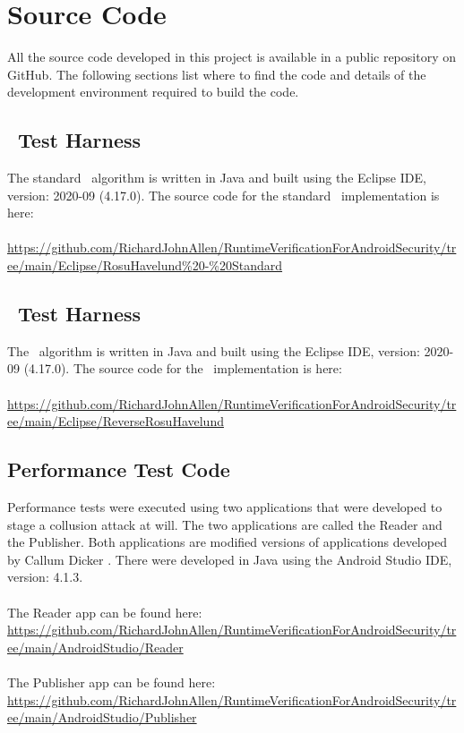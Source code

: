 \chapter{Source Code}
\label{app:Code}

All the source code developed in this project is available in a public repository on GitHub.  The following sections list where to find the code and details of the development environment required to build the code.

\section{\RH\ Test Harness}
\label{app:RHCode}

The standard \RH\ algorithm is written in Java and built using the Eclipse IDE, version: 2020-09 (4.17.0).  The source code for the standard \RH\ implementation is here:\\
\\
\noindent \url{https://github.com/RichardJohnAllen/RuntimeVerificationForAndroidSecurity/tree/main/Eclipse/RosuHavelund\%20-\%20Standard}

\section{\RRH\ Test Harness}
\label{app:RRHCode}

The \RRH\ algorithm is written in Java and built using the Eclipse IDE, version: 2020-09 (4.17.0).  The source code for the \RRH\ implementation is here:\\
\\
\noindent \url{https://github.com/RichardJohnAllen/RuntimeVerificationForAndroidSecurity/tree/main/Eclipse/ReverseRosuHavelund}

\section{Performance Test Code}
\label{app:PerformanceTestCode}

Performance tests were executed using two applications that were developed to stage a collusion attack at will.  The two applications are called the Reader and the Publisher.  Both applications are modified versions of applications developed by Callum Dicker \cite{Dicker}.  There were developed in Java using the Android Studio IDE, version: 4.1.3.\\
\\
\noindent The Reader app can be found here:\\
\noindent \url{https://github.com/RichardJohnAllen/RuntimeVerificationForAndroidSecurity/tree/main/AndroidStudio/Reader}\\
\\
\noindent The Publisher app can be found here:\\
\noindent \url{https://github.com/RichardJohnAllen/RuntimeVerificationForAndroidSecurity/tree/main/AndroidStudio/Publisher}\\

